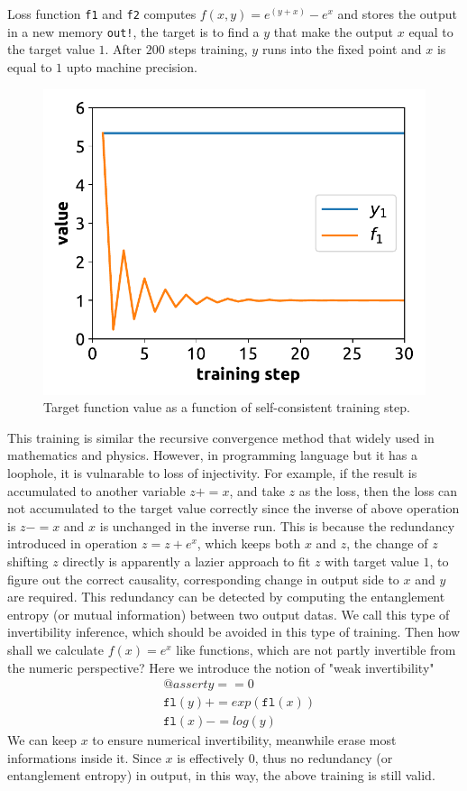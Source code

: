 \documentclass[aps,twocolumn,longbibliography,english,superscriptaddress,prr]{revtex4-1}
\newcommand{\<}{\langle}
\renewcommand{\>}{\rangle}
\newcommand{\fl}{\texttt{fl}}
\theoremstyle{definition}\newtheorem{definition}{\textit{Definition}}
\begin{document}
Loss function \texttt{f1} and \texttt{f2} computes $f(x, y) = e^{(y+x)} - e^x$ and stores the output in a new memory \texttt{out!}, the target is to find a $y$ that make the output $x$ equal to the target value $1$.
After $200$ steps training, $y$ runs into the fixed point and $x$ is equal to $1$ upto machine precision.

\begin{figure}
    \centerline{\includegraphics[width=\columnwidth,trim={0 0 0 0},clip]{images/fig1.pdf}}
    \caption{Target function value as a function of self-consistent training step.}\label{fig:invtrain}
\end{figure}

This training is similar the recursive convergence method that widely used in mathematics and physics.
However, in programming language but it has a loophole, it is vulnarable to loss of injectivity.
For example, if the result is accumulated to another variable $z += x$, and take $z$ as the loss, then the loss can not accumulated to the target value correctly since the inverse of above operation is $z -= x$ and $x$ is unchanged in the inverse run.
This is because the redundancy introduced in operation $z = z+e^x$, which keeps both $x$ and $z$, the change of $z$ shifting $z$ directly is apparently a lazier approach to fit $z$ with target value $1$, to figure out the correct causality, corresponding change in output side to $x$ and $y$ are required. This redundancy can be detected by computing the entanglement entropy (or mutual information) between two output datas. We call this type of invertibility inference, which should be avoided in this type of training. Then how shall we calculate $f(x) = e^x$ like functions, which are not partly invertible from the numeric perspective? Here we introduce the notion of "weak invertibility"
\begin{align}
    &@assert y == 0\\
    &\fl(y) += exp(\fl(x))\\
    &\fl(x) -= log(y)
\end{align}
We can keep $x$ to ensure numerical invertibility, meanwhile erase most informations inside it. Since $x$ is effectively $0$, thus no redundancy (or entanglement entropy) in output, in this way, the above training is still valid.
\end{document}
